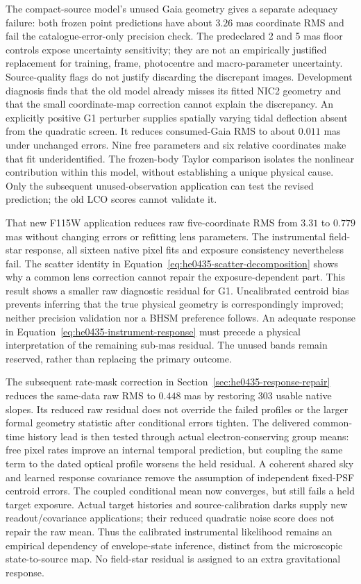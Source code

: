 The compact-source model's unused Gaia geometry gives a separate adequacy failure: both frozen
point predictions have about $3.26$ mas coordinate RMS and fail the
catalogue-error-only precision check. The predeclared 2 and 5 mas floor
controls expose uncertainty sensitivity; they are not an empirically
justified replacement for training, frame, photocentre and macro-parameter
uncertainty. Source-quality flags do not justify discarding the discrepant
images. Development diagnosis finds that the old model already misses
its fitted NIC2 geometry and that the small coordinate-map correction
cannot explain the discrepancy. An explicitly positive G1 perturber
supplies spatially varying tidal deflection absent from the quadratic
screen. It reduces consumed-Gaia RMS to about $0.011$ mas under unchanged
errors. Nine free parameters and six relative coordinates make that
fit underidentified. The frozen-body Taylor comparison isolates the
nonlinear contribution within this model, without establishing a unique
physical cause. Only the subsequent unused-observation application can
test the revised prediction; the old LCO scores cannot validate it.

That new F115W application reduces raw five-coordinate RMS from
$3.31$ to $0.779$ mas without changing errors or refitting lens parameters.
The instrumental field-star response, all sixteen native pixel fits
and exposure consistency nevertheless fail. The scatter identity in
Equation~\eqref{eq:he0435-scatter-decomposition} shows why a common lens
correction cannot repair the exposure-dependent part. This result
shows a smaller raw diagnostic residual for G1. Uncalibrated centroid
bias prevents inferring that the true physical geometry is correspondingly
improved; neither precision validation nor a BHSM preference follows.
An adequate response in Equation~\eqref{eq:he0435-instrument-response}
must precede a physical interpretation of the remaining sub-mas
residual. The unused bands remain reserved, rather than replacing
the primary outcome.

The subsequent rate-mask correction in
Section~\ref{sec:he0435-response-repair} reduces the same-data raw RMS
to $0.448$ mas by restoring 303 usable native slopes. Its reduced
raw residual does not override the failed profiles or the larger
formal geometry statistic after conditional errors tighten. The
delivered common-time history lead is then tested through actual
electron-conserving group means: free pixel rates improve an internal
temporal prediction, but coupling the same term to the dated optical
profile worsens the held residual. A coherent shared sky and learned
response covariance remove the assumption of independent fixed-PSF
centroid errors. The coupled conditional mean now converges, but
still fails a held target exposure. Actual target histories and
source-calibration darks supply new readout/covariance applications;
their reduced quadratic noise score does not repair the raw mean.
Thus the calibrated instrumental
likelihood remains an empirical dependency of envelope-state
inference, distinct from the microscopic state-to-source map. No
field-star residual is assigned to an extra gravitational response.


